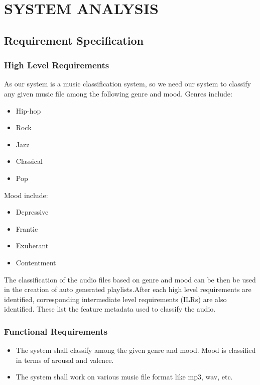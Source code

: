 \newpage
\section{SYSTEM ANALYSIS}
\subsection{Requirement Specification}
\subsubsection{High Level Requirements}
As our system is a music classification system, so we need our system to classify any given music file among the following genre and mood.
Genres include:
    \begin{itemize}
    \item Hip-hop
    \item Rock
    \item Jazz
    \item Classical
    \item Pop
    \end{itemize}
Mood include:
    \begin{itemize}
    \item Depressive
    \item Frantic
    \item Exuberant
    \item Contentment
    \end{itemize}
    The classification of the audio files based on genre and mood can be then be used in the creation of auto generated playlists.After each high level requirements are identified, corresponding intermediate level requirements
    (ILRs) are also identified. These list the feature metadata used to classify the audio.
\subsubsection{Functional Requirements}
\begin{itemize}
        \item The system shall classify among the given genre and mood. Mood is classified in terms of arousal and valence. 
        \item The system shall work on various music file format like mp3, wav, etc.
        \end{itemize}

